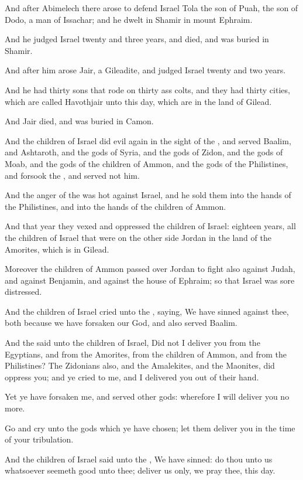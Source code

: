 \Chapter
\Verse And after Abimelech there arose to defend Israel Tola the son of Puah, the son of Dodo, a man of Issachar; and he dwelt in Shamir in mount Ephraim.

\Verse And he judged Israel twenty and three years, and died, and was buried in Shamir.

\Verse And after him arose Jair, a Gileadite, and judged Israel twenty and two years.

\Verse And he had thirty sons that rode on thirty ass colts, and they had thirty cities, which are called Havothjair unto this day, which are in the land of Gilead.

\Verse And Jair died, and was buried in Camon.

\Verse And the children of Israel did evil again in the sight of the \LORD, and served Baalim, and Ashtaroth, and the gods of Syria, and the gods of Zidon, and the gods of Moab, and the gods of the children of Ammon, and the gods of the Philistines, and forsook the \LORD, and served not him.

\Verse And the anger of the \LORD was hot against Israel, and he sold them into the hands of the Philistines, and into the hands of the children of Ammon.

\Verse And that year they vexed and oppressed the children of Israel: eighteen years, all the children of Israel that were on the other side Jordan in the land of the Amorites, which is in Gilead.

\Verse Moreover the children of Ammon passed over Jordan to fight also against Judah, and against Benjamin, and against the house of Ephraim; so that Israel was sore distressed.

\Verse And the children of Israel cried unto the \LORD, saying, We have sinned against thee, both because we have forsaken our God, and also served Baalim.

\Verse And the \LORD said unto the children of Israel, Did not I deliver you from the Egyptians, and from the Amorites, from the children of Ammon, and from the Philistines?  \Verse The Zidonians also, and the Amalekites, and the Maonites, did oppress you; and ye cried to me, and I delivered you out of their hand.

\Verse Yet ye have forsaken me, and served other gods: wherefore I will deliver you no more.

\Verse Go and cry unto the gods which ye have chosen; let them deliver you in the time of your tribulation.

\Verse And the children of Israel said unto the \LORD, We have sinned: do thou unto us whatsoever seemeth good unto thee; deliver us only, we pray thee, this day.

